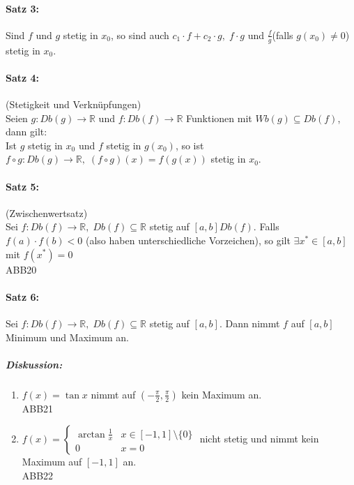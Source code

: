 \paragraph{Satz 3:} Sind $f$ und $g$ stetig in $x_0$, so sind auch $c_1 \cdot f + c_2 \cdot g, \; f\cdot g$ und $\frac{f}{g}$(falls $g(x_0)\not = 0$) stetig in $x_0$.

\paragraph{Satz 4:} (Stetigkeit und Verknüpfungen)\\
Seien $g: Db(g) \to \mathbb{R}$ und $f: Db(f) \to \mathbb{R}$ Funktionen mit $Wb(g)\subseteq Db(f)$, dann gilt:\\
Ist $g$ stetig in $x_0$ und $f$ stetig in $g(x_0)$, so ist $f\circ g:Db(g) \to \mathbb{R}, \; (f\circ g)(x) = f(g(x))$ stetig in $x_0$.

\paragraph{Satz 5:} (Zwischenwertsatz)\\
Sei $f: Db(f) \to \mathbb{R}, \; Db(f)\subseteq \mathbb{R}$ stetig auf $[a,b]  Db(f)$. Falls $f(a) \cdot f(b) < 0$ (also haben unterschiedliche Vorzeichen), so gilt $\exists x^*\in [a,b]$ mit $f(x^*)=0$\\
ABB20
\paragraph{Satz 6:} Sei $f: Db(f) \to \mathbb{R}, \; Db(f) \subseteq \mathbb{R}$ stetig auf $[a,b]$. Dann nimmt $f$ auf $[a,b]$ Minimum und Maximum an.

\subparagraph{Diskussion:}
\begin{enumerate}[label=\alph*.)]
\item $f(x) = \tan x$ nimmt auf $\left( - \frac{\pi}{2}, \frac{\pi}{2}\right)$ kein Maximum an.\\
ABB21
\item $f(x) = \begin{cases}
\arctan \frac{1}{x} & x \in [-1,1]\setminus \{0\}\\
0 & x = 0
\end{cases}$ nicht stetig und nimmt kein Maximum auf $[-1,1]$ an.\\
ABB22
\end{enumerate}


 